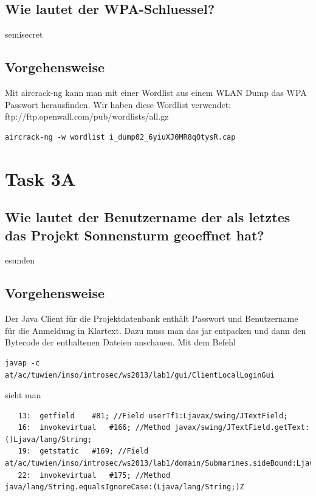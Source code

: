 \documentclass[12pt,a4paper,titlepage,oneside]{scrartcl}
\begin{document}
\subsection{Wie lautet der WPA-Schluessel?}

semisecret

\subsection{Vorgehensweise}

Mit aircrack-ng kann man mit einer Wordlist aus einem WLAN Dump das WPA Passwort herausfinden. Wir haben diese Wordlist verwendet: ftp://ftp.openwall.com/pub/wordlists/all.gz
\begin{lstlisting}
aircrack-ng -w wordlist i_dump02_6yiuXJ0MR8qOtysR.cap
\end{lstlisting}

\section{Task 3A}

\subsection{Wie lautet der Benutzername der als letztes das Projekt Sonnensturm geoeffnet hat?}

esunden

\subsection{Vorgehensweise}

Der Java Client für die Projektdatenbank enthält Passwort und Benutzername für die Anmeldung in Klartext. Dazu muss man das jar entpacken und dann den Bytecode der enthaltenen Dateien anschauen. Mit dem Befehl
\begin{lstlisting}
javap -c at/ac/tuwien/inso/introsec/ws2013/lab1/gui/ClientLocalLoginGui
\end{lstlisting}
sieht man 
\begin{lstlisting}
   13:  getfield    #81; //Field userTf1:Ljavax/swing/JTextField;
   16:  invokevirtual   #166; //Method javax/swing/JTextField.getText:()Ljava/lang/String;
   19:  getstatic   #169; //Field at/ac/tuwien/inso/introsec/ws2013/lab1/domain/Submarines.sideBound:Ljava/lang/String;
   22:  invokevirtual   #175; //Method java/lang/String.equalsIgnoreCase:(Ljava/lang/String;)Z
\end{lstlisting}
\end{document}
